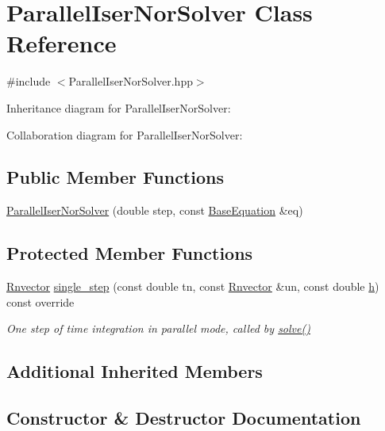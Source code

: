 \hypertarget{classParallelIserNorSolver}{}\section{Parallel\+Iser\+Nor\+Solver Class Reference}
\label{classParallelIserNorSolver}


{\ttfamily \#include $<$Parallel\+Iser\+Nor\+Solver.\+hpp$>$}



Inheritance diagram for Parallel\+Iser\+Nor\+Solver\+:


Collaboration diagram for Parallel\+Iser\+Nor\+Solver\+:
\subsection*{Public Member Functions}
\begin{DoxyCompactItemize}
\item 
\hyperlink{classParallelIserNorSolver_a5316d47db330753f44ed088250857ec0}{Parallel\+Iser\+Nor\+Solver} (double step, const \hyperlink{classBaseEquation}{Base\+Equation} \&eq)
\end{DoxyCompactItemize}
\subsection*{Protected Member Functions}
\begin{DoxyCompactItemize}
\item 
\hyperlink{utils_8hpp_a8e0cccfe9e5cee5140bfcfbd9a3a6a0e}{Rnvector} \hyperlink{classParallelIserNorSolver_a10cac84b730cf473723461622f1a74e0}{single\+\_\+step} (const double tn, const \hyperlink{utils_8hpp_a8e0cccfe9e5cee5140bfcfbd9a3a6a0e}{Rnvector} \&un, const double \hyperlink{classBaseSolver_a6dbedd1610b0979379e6acbb0a4093cd}{h}) const override
\begin{DoxyCompactList}\small\item\em One step of time integration in parallel mode, called by \hyperlink{classRKSolver_aa251eaaa56b4ef39d95347579b8a6259}{solve()} \end{DoxyCompactList}\end{DoxyCompactItemize}
\subsection*{Additional Inherited Members}


\subsection{Constructor \& Destructor Documentation}
\mbox{\label{classParallelIserNorSolver_a5316d47db330753f44ed088250857ec0}} 
